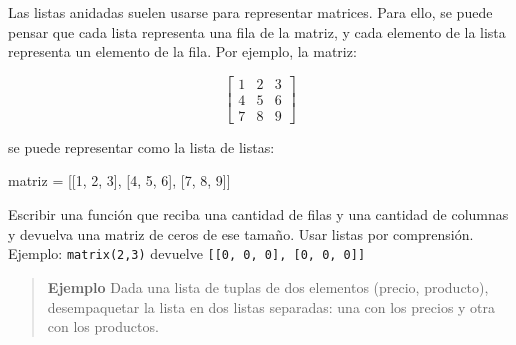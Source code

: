 \documentclass[
  letterpaper,
  DIV=11,
  numbers=noendperiod]{scrreprt}
\newenvironment{Shaded}{\begin{snugshade}}{\end{snugshade}}
\newcommand{\DecValTok}[1]{\textcolor[rgb]{0.68,0.00,0.00}{#1}}
\newcommand{\NormalTok}[1]{\textcolor[rgb]{0.00,0.23,0.31}{#1}}
\newcommand{\OperatorTok}[1]{\textcolor[rgb]{0.37,0.37,0.37}{#1}}
\begin{document}
Las listas anidadas suelen usarse para representar matrices. Para ello,
se puede pensar que cada lista representa una fila de la matriz, y cada
elemento de la lista representa un elemento de la fila. Por ejemplo, la
matriz:

\[
\begin{bmatrix}
1 & 2 & 3 \\
4 & 5 & 6 \\
7 & 8 & 9
\end{bmatrix}
\]

se puede representar como la lista de listas:

\begin{Shaded}
\begin{Highlighting}[]
\NormalTok{matriz }\OperatorTok{=}\NormalTok{ [[}\DecValTok{1}\NormalTok{, }\DecValTok{2}\NormalTok{, }\DecValTok{3}\NormalTok{], [}\DecValTok{4}\NormalTok{, }\DecValTok{5}\NormalTok{, }\DecValTok{6}\NormalTok{], [}\DecValTok{7}\NormalTok{, }\DecValTok{8}\NormalTok{, }\DecValTok{9}\NormalTok{]]}
\end{Highlighting}
\end{Shaded}

\begin{tcolorbox}[enhanced jigsaw, bottomrule=.15mm, leftrule=.75mm, opacityback=0, colback=white, toprule=.15mm, bottomtitle=1mm, opacitybacktitle=0.6, rightrule=.15mm, left=2mm, arc=.35mm, coltitle=black, title=\textcolor{quarto-callout-important-color}{\faExclamation}\hspace{0.5em}{Ejercicio Desafío}, breakable, toptitle=1mm, colframe=quarto-callout-important-color-frame, titlerule=0mm, colbacktitle=quarto-callout-important-color!10!white]

Escribir una función que reciba una cantidad de filas y una cantidad de
columnas y devuelva una matriz de ceros de ese tamaño. Usar listas por
comprensión.\\
Ejemplo: \texttt{matrix(2,3)} devuelve
\texttt{{[}{[}0,\ 0,\ 0{]},\ {[}0,\ 0,\ 0{]}{]}}

\end{tcolorbox}

\hfill\break

\begin{quote}
\textbf{Ejemplo} Dada una lista de tuplas de dos elementos (precio,
producto), desempaquetar la lista en dos listas separadas: una con los
precios y otra con los productos.
\end{quote}
\end{document}
